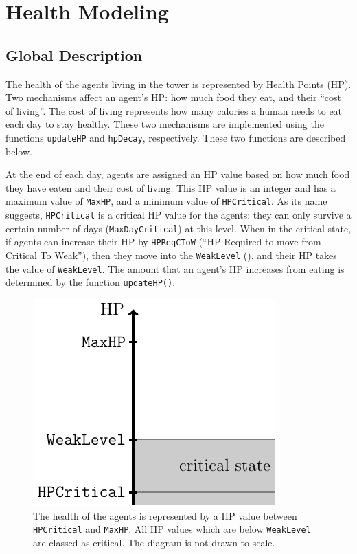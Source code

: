 \section{Health Modeling}\label{health_modeling}

%
%
\subsection{Global Description}

The health of the agents living in the tower is represented by Health Points (HP). Two mechanisms affect an agent's HP: how much food they eat, and their ``cost of living''. The cost of living represents how many calories a human needs to eat each day to stay healthy. These two mechanisms are implemented using the functions \lstinline$updateHP$ and \lstinline$hpDecay$, respectively. These two functions are described below.

At the end of each day, agents are assigned an HP value based on how much food they have eaten and their cost of living. This HP value is an integer and has a maximum value of \lstinline$MaxHP$, and a minimum value of \lstinline$HPCritical$. As its name suggests, \lstinline$HPCritical$ is a critical HP value for the agents: they can only survive a certain number of days (\lstinline$MaxDayCritical$) at this level. When in the critical state, if agents can increase their HP by \lstinline$HPReqCToW$ (``HP Required to move from Critical To Weak''), then they move into the \lstinline$WeakLevel$ (), and their HP takes the value of \lstinline$WeakLevel$. The amount that an agent's HP increases from eating is determined by the function \lstinline$updateHP()$.

\begin{figure}[htb]
    \centering
    \includegraphics[width=0.3\linewidth]{002_simulation_structure/images/health_global.pdf}
    \caption{The health of the agents is represented by a HP value between \lstinline$HPCritical$ and \lstinline$MaxHP$. All HP values which are below \lstinline$WeakLevel$ are classed as critical. The diagram is not drawn to scale.}
    \label{fig:health_system}
\end{figure}

